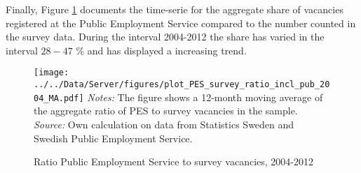 

Finally, Figure \ref{fig:agg_PES_survey_share} documents the time-serie for the aggregate share of vacancies registered at the Public Employment Service compared to the number counted in the survey data. During the interval 2004-2012 the share has varied in the interval $28-47$ \% and has displayed a increasing trend.

\begin{figure}[h]
\centering
\caption{Ratio Public Employment Service to survey vacancies, 2004-2012 }
\texttt{[image: ../../Data/Server/figures/plot\_PES\_survey\_ratio\_incl\_pub\_2004\_MA.pdf]}
\flushleft
\footnotesize{\emph{Notes:} The figure shows a 12-month moving average of the aggregate ratio of PES to survey vacancies in the sample.} \\
\footnotesize{\emph{Source:} Own calculation on data from Statistics Sweden and Swedish Public Employment Service.}
\label{fig:agg_PES_survey_share}
\end{figure}